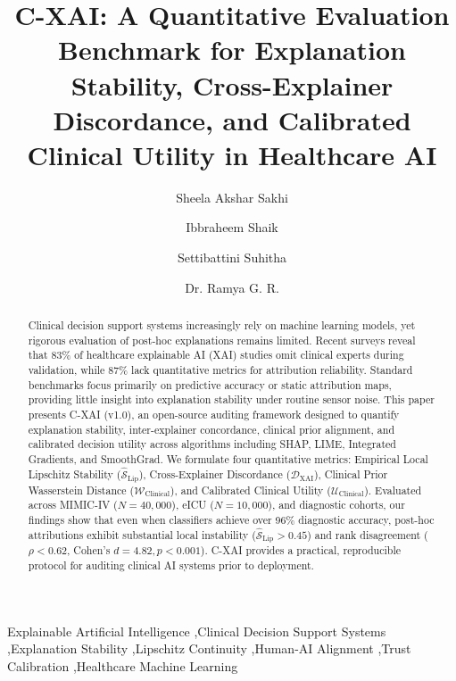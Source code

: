 \documentclass[3p,times,procedia]{elsarticle}
\theoremstyle{definition}
\begin{document}
\setlength{\bibsep}{0.8pt}
\begin{frontmatter}

\title{C-XAI: A Quantitative Evaluation Benchmark for Explanation Stability, Cross-Explainer Discordance, and Calibrated Clinical Utility in Healthcare AI}

\author[a]{Sheela Akshar Sakhi} 
\author[a]{Ibbraheem Shaik}
\author[a]{Settibattini Suhitha}
\author[b]{Dr. Ramya G. R.}

\address[a]{Department of Computer Science and Engineering, Amrita School of Computing, Amrita Vishwa Vidyapeetham, Coimbatore, India}
\address[b]{Assistant Professor --- CSE, Amrita School of Computing, Amrita Vishwa Vidyapeetham, Coimbatore, India (Corresponding author: gr\_ramya@cb.amrita.edu)}

\begin{abstract}
Clinical decision support systems increasingly rely on machine learning models, yet rigorous evaluation of post-hoc explanations remains limited. Recent surveys reveal that 83\% of healthcare explainable AI (XAI) studies omit clinical experts during validation, while 87\% lack quantitative metrics for attribution reliability. Standard benchmarks focus primarily on predictive accuracy or static attribution maps, providing little insight into explanation stability under routine sensor noise. This paper presents C-XAI (v1.0), an open-source auditing framework designed to quantify explanation stability, inter-explainer concordance, clinical prior alignment, and calibrated decision utility across algorithms including SHAP, LIME, Integrated Gradients, and SmoothGrad. We formulate four quantitative metrics: Empirical Local Lipschitz Stability ($\widehat{\mathcal{S}}_{\text{Lip}}$), Cross-Explainer Discordance ($\mathcal{D}_{\text{XAI}}$), Clinical Prior Wasserstein Distance ($\mathcal{W}_{\text{Clinical}}$), and Calibrated Clinical Utility ($\mathcal{U}_{\text{Clinical}}$). Evaluated across MIMIC-IV ($N=40,000$), eICU ($N=10,000$), and diagnostic cohorts, our findings show that even when classifiers achieve over 96\% diagnostic accuracy, post-hoc attributions exhibit substantial local instability ($\widehat{\mathcal{S}}_{\text{Lip}} > 0.45$) and rank disagreement ($\rho < 0.62$, Cohen's $d = 4.82, p < 0.001$). C-XAI provides a practical, reproducible protocol for auditing clinical AI systems prior to deployment.
\end{abstract}

\begin{keyword}
Explainable Artificial Intelligence \sep Clinical Decision Support Systems \sep Explanation Stability \sep Lipschitz Continuity \sep Human-AI Alignment \sep Trust Calibration \sep Healthcare Machine Learning
\end{keyword}

\end{frontmatter}
\end{document}

